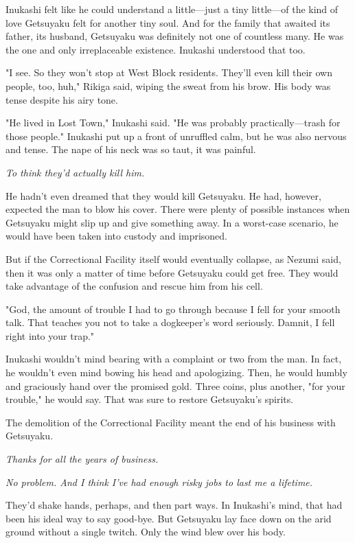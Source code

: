 Inukashi felt like he could understand a little---just a tiny little---of
the kind of love Getsuyaku felt for another tiny soul. And for the
family that awaited its father, its husband, Getsuyaku was definitely
not one of countless many. He was the one and only irreplaceable
existence. Inukashi understood that too.

"I see. So they won't stop at West Block residents. They'll even kill
their own people, too, huh," Rikiga said, wiping the sweat from his
brow. His body was tense despite his airy tone.

"He lived in Lost Town," Inukashi said. "He was probably
practically---trash for those people." Inukashi put up a front of
unruffled calm, but he was also nervous and tense. The nape of his neck
was so taut, it was painful.

\emph{To think they'd actually kill him.}

He hadn't even dreamed that they would kill Getsuyaku. He had, however,
expected the man to blow his cover. There were plenty of possible
instances when Getsuyaku might slip up and give something away. In a
worst-case scenario, he would have been taken into custody and
imprisoned.

But if the Correctional Facility itself would eventually collapse, as
Nezumi said, then it was only a matter of time before Getsuyaku could
get free. They would take advantage of the confusion and rescue him from
his cell.

"God, the amount of trouble I had to go through because I fell for your
smooth talk. That teaches you not to take a dogkeeper's word seriously.
Damnit, I fell right into your trap."

Inukashi wouldn't mind bearing with a complaint or two from the man. In
fact, he wouldn't even mind bowing his head and apologizing. Then, he
would humbly and graciously hand over the promised gold. Three coins,
plus another, "for your trouble," he would say. That was sure to restore
Getsuyaku's spirits.

The demolition of the Correctional Facility meant the end of his
business with Getsuyaku.

\emph{Thanks for all the years of business.}

\emph{No problem. And I think I've had enough risky jobs to last me a
lifetime.}

They'd shake hands, perhaps, and then part ways. In Inukashi's mind,
that had been his ideal way to say good-bye. But Getsuyaku lay face down
on the arid ground without a single twitch. Only the wind blew over his
body.

